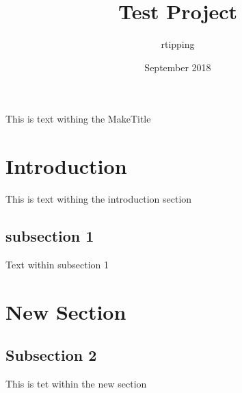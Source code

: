 \documentclass{article}
\title{Test Project}
\author{rtipping }
\date{September 2018}
\begin{document}
This is text withing the MakeTitle
\tableofcontents

\section{Introduction}
This is text withing the introduction section
\subsection{subsection 1}
Text within subsection 1
\section{New Section}
\subsection{Subsection 2}
This is tet within the new section
\end{document}
